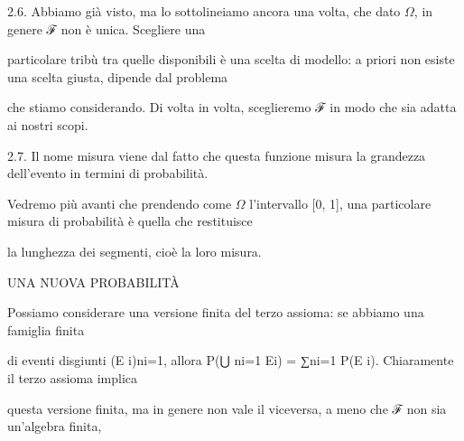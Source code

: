 \documentclass[a4paper,portrait,12pt]{article}
\begin{document}
\begin{flushleft}
2.6. Abbiamo gi\`{a} visto, ma lo sottolineiamo ancora una volta, che dato $\Omega$, in genere ℱ non \`{e} unica. Scegliere una
\end{flushleft}


\begin{flushleft}
particolare tribù tra quelle disponibili \`{e} una scelta di modello: a priori non esiste una scelta giusta, dipende dal problema
\end{flushleft}


\begin{flushleft}
che stiamo considerando. Di volta in volta, sceglieremo ℱ in modo che sia adatta ai nostri scopi.
\end{flushleft}


\begin{flushleft}
2.7. Il nome misura viene dal fatto che questa funzione misura la grandezza dell'evento in termini di probabilit\`{a}.
\end{flushleft}


\begin{flushleft}
Vedremo più avanti che prendendo come $\Omega$ l'intervallo [0, 1], una particolare misura di probabilit\`{a} \`{e} quella che restituisce
\end{flushleft}


\begin{flushleft}
la lunghezza dei segmenti, cio\`{e} la loro misura.
\end{flushleft}










\begin{flushleft}
UNA NUOVA PROBABILIT\`{A}
\end{flushleft}





\begin{flushleft}
Possiamo considerare una versione finita del terzo assioma: se abbiamo una famiglia finita
\end{flushleft}


\begin{flushleft}
di eventi disgiunti (E i)ni=1, allora P(⋃ ni=1 Ei) = ∑ni=1 P(E i). Chiaramente il terzo assioma implica
\end{flushleft}


\begin{flushleft}
questa versione finita, ma in genere non vale il viceversa, a meno che ℱ non sia un'algebra finita,
\end{flushleft}
\end{document}
